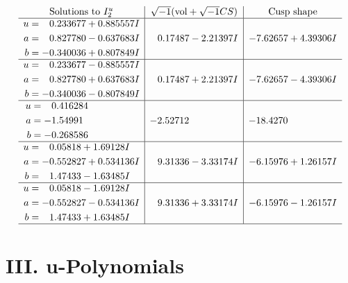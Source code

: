 \documentclass[1p]{elsarticle_modified}
\theoremstyle{definition}
\newcommand{\I}{\sqrt{-1}}
\begin{document}
$$\begin{array}{c|c|c}  
\text{Solutions to }I^u_{2}& \I (\text{vol} + \sqrt{-1}CS) & \text{Cusp shape}\\
 \hline 
\begin{aligned}
u &= \phantom{-}0.233677 + 0.885557 I \\
a &= \phantom{-}0.827780 - 0.637683 I \\
b &= -0.340036 + 0.807849 I\end{aligned}
 & \phantom{-}0.17487 - 2.21397 I & -7.62657 + 4.39306 I \\ \hline\begin{aligned}
u &= \phantom{-}0.233677 - 0.885557 I \\
a &= \phantom{-}0.827780 + 0.637683 I \\
b &= -0.340036 - 0.807849 I\end{aligned}
 & \phantom{-}0.17487 + 2.21397 I & -7.62657 - 4.39306 I \\ \hline\begin{aligned}
u &= \phantom{-}0.416284\phantom{ +0.000000I} \\
a &= -1.54991\phantom{ +0.000000I} \\
b &= -0.268586\phantom{ +0.000000I}\end{aligned}
 & -2.52712\phantom{ +0.000000I} & -18.4270\phantom{ +0.000000I} \\ \hline\begin{aligned}
u &= \phantom{-}0.05818 + 1.69128 I \\
a &= -0.552827 + 0.534136 I \\
b &= \phantom{-}1.47433 - 1.63485 I\end{aligned}
 & \phantom{-}9.31336 - 3.33174 I & -6.15976 + 1.26157 I \\ \hline\begin{aligned}
u &= \phantom{-}0.05818 - 1.69128 I \\
a &= -0.552827 - 0.534136 I \\
b &= \phantom{-}1.47433 + 1.63485 I\end{aligned}
 & \phantom{-}9.31336 + 3.33174 I & -6.15976 - 1.26157 I\\
 \hline 
 \end{array}$$\newpage
\newpage\renewcommand{\arraystretch}{1}
\centering \section*{ III. u-Polynomials}
\end{document}
